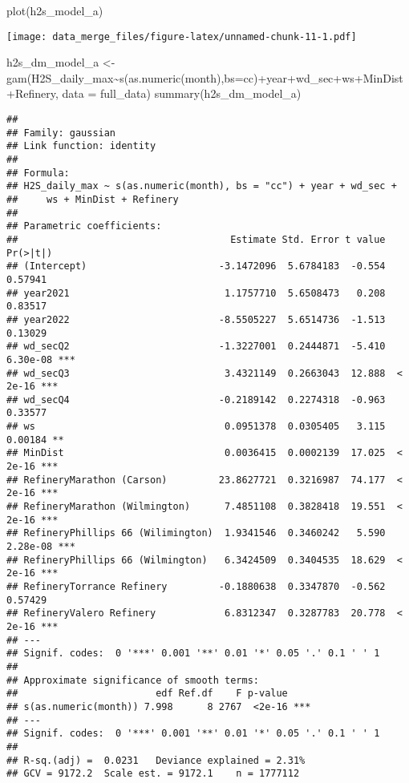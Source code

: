 \documentclass[
]{article}
\newenvironment{Shaded}{\begin{snugshade}}{\end{snugshade}}
\newcommand{\AttributeTok}[1]{\textcolor[rgb]{0.77,0.63,0.00}{#1}}
\newcommand{\FunctionTok}[1]{\textcolor[rgb]{0.00,0.00,0.00}{#1}}
\newcommand{\NormalTok}[1]{#1}
\newcommand{\OtherTok}[1]{\textcolor[rgb]{0.56,0.35,0.01}{#1}}
\newcommand{\SpecialCharTok}[1]{\textcolor[rgb]{0.00,0.00,0.00}{#1}}
\newcommand{\StringTok}[1]{\textcolor[rgb]{0.31,0.60,0.02}{#1}}
\begin{document}
\begin{Shaded}
\begin{Highlighting}[]
\FunctionTok{plot}\NormalTok{(h2s\_model\_a)}
\end{Highlighting}
\end{Shaded}

\texttt{[image: data\_merge\_files/figure-latex/unnamed-chunk-11-1.pdf]}

\begin{Shaded}
\begin{Highlighting}[]
\NormalTok{h2s\_dm\_model\_a }\OtherTok{\textless{}{-}} \FunctionTok{gam}\NormalTok{(H2S\_daily\_max}\SpecialCharTok{\textasciitilde{}}\FunctionTok{s}\NormalTok{(}\FunctionTok{as.numeric}\NormalTok{(month),}\AttributeTok{bs=}\StringTok{\textquotesingle{}cc\textquotesingle{}}\NormalTok{)}\SpecialCharTok{+}\NormalTok{year}\SpecialCharTok{+}\NormalTok{wd\_sec}\SpecialCharTok{+}\NormalTok{ws}\SpecialCharTok{+}\NormalTok{MinDist}\SpecialCharTok{+}\NormalTok{Refinery, }\AttributeTok{data =}\NormalTok{ full\_data)}
\FunctionTok{summary}\NormalTok{(h2s\_dm\_model\_a)}
\end{Highlighting}
\end{Shaded}

\begin{verbatim}
## 
## Family: gaussian 
## Link function: identity 
## 
## Formula:
## H2S_daily_max ~ s(as.numeric(month), bs = "cc") + year + wd_sec + 
##     ws + MinDist + Refinery
## 
## Parametric coefficients:
##                                     Estimate Std. Error t value Pr(>|t|)    
## (Intercept)                       -3.1472096  5.6784183  -0.554  0.57941    
## year2021                           1.1757710  5.6508473   0.208  0.83517    
## year2022                          -8.5505227  5.6514736  -1.513  0.13029    
## wd_secQ2                          -1.3227001  0.2444871  -5.410 6.30e-08 ***
## wd_secQ3                           3.4321149  0.2663043  12.888  < 2e-16 ***
## wd_secQ4                          -0.2189142  0.2274318  -0.963  0.33577    
## ws                                 0.0951378  0.0305405   3.115  0.00184 ** 
## MinDist                            0.0036415  0.0002139  17.025  < 2e-16 ***
## RefineryMarathon (Carson)         23.8627721  0.3216987  74.177  < 2e-16 ***
## RefineryMarathon (Wilmington)      7.4851108  0.3828418  19.551  < 2e-16 ***
## RefineryPhillips 66 (Wilimington)  1.9341546  0.3460242   5.590 2.28e-08 ***
## RefineryPhillips 66 (Wilmington)   6.3424509  0.3404535  18.629  < 2e-16 ***
## RefineryTorrance Refinery         -0.1880638  0.3347870  -0.562  0.57429    
## RefineryValero Refinery            6.8312347  0.3287783  20.778  < 2e-16 ***
## ---
## Signif. codes:  0 '***' 0.001 '**' 0.01 '*' 0.05 '.' 0.1 ' ' 1
## 
## Approximate significance of smooth terms:
##                        edf Ref.df    F p-value    
## s(as.numeric(month)) 7.998      8 2767  <2e-16 ***
## ---
## Signif. codes:  0 '***' 0.001 '**' 0.01 '*' 0.05 '.' 0.1 ' ' 1
## 
## R-sq.(adj) =  0.0231   Deviance explained = 2.31%
## GCV = 9172.2  Scale est. = 9172.1    n = 1777112
\end{verbatim}
\end{document}
